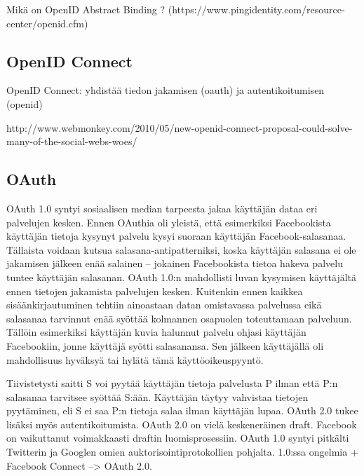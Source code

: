 \documentclass[english,gradu]{tktltiki}
\begin{document}
  Mikä on OpenID Abstract Binding ? (https://www.pingidentity.com/resource-center/openid.cfm)


  \subsection{OpenID Connect} %
  \label{sub:openid_connect}
  OpenID Connect: yhdistää tiedon jakamisen (oauth) ja autentikoitumisen (openid)

  http://www.webmonkey.com/2010/05/new-openid-connect-proposal-could-solve-many-of-the-social-webs-woes/



  \subsection{OAuth} %
  \label{sub:oauth}

  OAuth 1.0 syntyi sosiaalisen median tarpeesta jakaa käyttäjän dataa eri palvelujen kesken. Ennen OAuthia oli yleistä, että esimerkiksi Facebookista käyttäjän tietoja kysynyt palvelu kysyi suoraan käyttäjän Facebook-salasanaa. Tällaista voidaan kutsua salasana-antipatterniksi, koska käyttäjän salasana ei ole jakamisen jälkeen enää salainen -- jokainen Facebookista tietoa hakeva palvelu tuntee käyttäjän salasanan. OAuth 1.0:n mahdollisti luvan kysymisen käyttäjältä ennen tietojen jakamista palvelujen kesken. Kuitenkin ennen kaikkea sisäänkirjautuminen tehtiin ainoastaan datan omistavassa palvelussa eikä salasanaa tarvinnut enää syöttää kolmannen osapuolen toteuttamaan palveluun. Tällöin esimerkiksi käyttäjän kuvia halunnut palvelu ohjasi käyttäjän Facebookiin, jonne käyttäjä syötti salasanansa. Sen jälkeen käyttäjällä oli mahdollisuus hyväksyä tai hylätä tämä käyttöoikeuspyyntö.

  Tiivistetysti saitti S voi pyytää käyttäjän tietoja palvelusta P ilman että P:n salasanaa tarvitsee syöttää S:ään. Käyttäjän täytyy vahvistaa tietojen pyytäminen, eli S ei saa P:n tietoja salaa ilman käyttäjän lupaa.
  OAuth 2.0 tukee lisäksi myös autentikoitumista. OAuth 2.0 on vielä keskeneräinen draft. Facebook on vaikuttanut voimakkaasti draftin luomisprosessiin. OAuth 1.0 syntyi pitkälti Twitterin ja Googlen omien auktorisointiprotokollien pohjalta. 1.0:ssa ongelmia + Facebook Connect --> OAuth 2.0.
\end{document}
